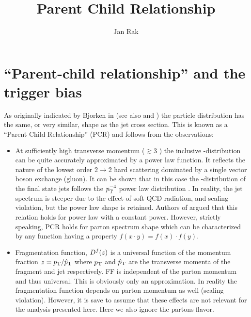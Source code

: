 \documentclass[12pt]{article}
\begin{document}
\title{Parent Child Relationship}
\author{Jan Rak}
\date{}
\maketitle

\section{``Parent-child relationship'' and the trigger bias} \label{sec:parent-child}

As originally indicated by Bjorken in \cite{Bjorken:1973kd}  (see also \cite{Adler:2006sc} and \cite{Tannenbaum:2006ku}) the particle 
\pt{} distribution has the same, or very similar, shape as  the jet cross section. This is known as a ``Parent-Child Relationship'' (PCR) and  follows from the observations: 
\begin{itemize}
\item At sufficiently high transverse momentum (\pt{}$\gtrsim$3 \gevc) the inclusive \pt{}-distribution can be quite accurately approximated by a power law function. It reflects the nature of the lowest order 2$\rightarrow$2 hard scattering dominated by a  single vector boson exchange (gluon). It can be shown that in this case the \pt{}-distribution of the final state jets follows the $p_{\rm T}^{-4}$ power law distribution \cite{Feynman1}. In reality, the jet \pt{} spectrum is steeper due to the effect of soft QCD radiation, and scaling violation, but the power law shape is retained. Authors of \cite{Jacob:1978mj} argued that this relation holds for power law  with a constant power. However, strictly speaking, PCR holds for parton spectrum shape which can be characterized by any function having a property $f(x\cdot y)=f(x)\cdot f(y)$. 
\item Fragmentation function, $D^f(z)$ is a universal function of the momentum fraction $z=p_{\rm T}/\hat{p}_{\rm T}$ where $p_{\rm T}$ and $\hat{p}_{\rm T}$ are the transverse momenta of the fragment and jet respectively. FF is independent of the parton momentum and thus universal. This is obviously only an approximation. In reality the fragmentation function depends on parton momentum as well (scaling violation). However, it is save to assume that these effects are not relevant for the analysis presented here. Here we also ignore the partons flavor. 
\end{itemize}


\end{document}
